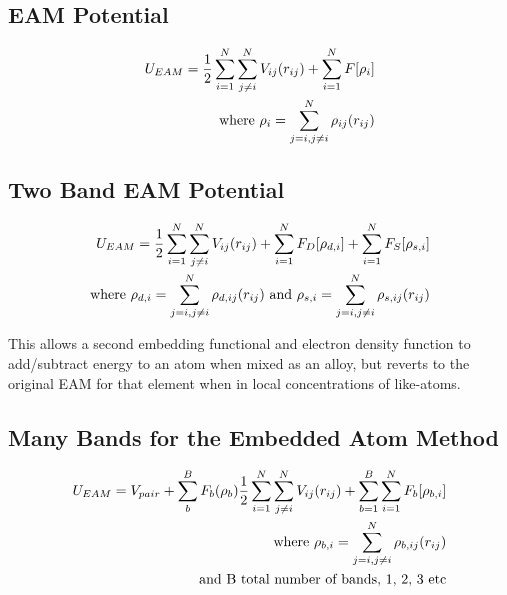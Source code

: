\documentclass[12pt,twoside]{manual}
\begin{document}
\FloatBarrier
\subsection{EAM Potential}

\begin{equation}
\begin{split}
U_{EAM} = \frac{1}{2} \sum \limits_{i=1}^{N} \sum \limits_{j\ne i}^{N} V_{ij}(r_{ij}) + \sum \limits_{i=1}^{N} F[\rho _{i}] \\
\textnormal{where   } \rho_{i} = \sum \limits_{j=i,j \ne i}^{N} \rho_{ij}(r_{ij})
\end{split}
\label{eq:eqEAM}
\end{equation}


\FloatBarrier
\subsection{Two Band EAM Potential}

\begin{equation}
\begin{split}
U_{EAM} = \frac{1}{2} \sum \limits_{i=1}^{N} \sum \limits_{j\ne i}^{N} V_{ij}(r_{ij}) + \sum \limits_{i=1}^{N} F_{D}[\rho _{d,i}] + \sum \limits_{i=1}^{N} F_{S}[\rho _{s,i}] \\
\textnormal{where   } \rho_{d,i} = \sum \limits_{j=i,j \ne i}^{N} \rho_{d,ij}(r_{ij})
\textnormal{  and  } \rho_{s,i} = \sum \limits_{j=i,j \ne i}^{N} \rho_{s,ij}(r_{ij})
\end{split}
\end{equation}

This allows a second embedding functional and electron density function to add/subtract energy to an atom when mixed as an alloy, but reverts to the original EAM for that element when in local concentrations of like-atoms.


\FloatBarrier
\subsection{Many Bands for the Embedded Atom Method}

\begin{equation}
\begin{split}
U_{EAM} = V_{pair} + \sum_{b}^B F_b (\rho_b)
\frac{1}{2} \sum \limits_{i=1}^{N} \sum \limits_{j\ne i}^{N} V_{ij}(r_{ij}) + \sum \limits_{b=1}^{B} \sum \limits_{i=1}^{N} F_{b}[\rho _{b,i}] \\
\textnormal{where   } \rho_{b,i} = \sum \limits_{j=i,j \ne i}^{N} \rho_{b,ij}(r_{ij}) \\
\textnormal{and B total number of bands, 1, 2, 3 etc}
\end{split}
\end{equation}
\end{document}
